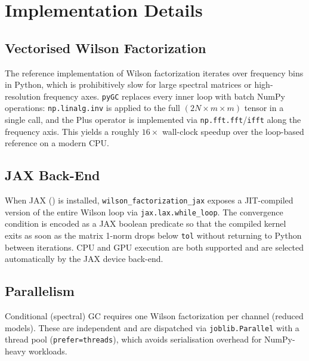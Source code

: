 \documentclass[10pt,a4paper,onecolumn]{article}
\begin{document}
\section{Implementation Details}\label{implementation}

\subsection{Vectorised Wilson Factorization}\label{vectorised-wilson}

The reference implementation of Wilson factorization iterates over
frequency bins in Python, which is prohibitively slow for large spectral
matrices or high-resolution frequency axes. \texttt{pyGC} replaces every
inner loop with batch NumPy operations: \texttt{np.linalg.inv} is
applied to the full \((2N \times m \times m)\) tensor in a single call,
and the Plus operator is implemented via \texttt{np.fft.fft}/\texttt{ifft}
along the frequency axis. This yields a roughly \(16\times\) wall-clock
speedup over the loop-based reference on a modern CPU.

\subsection{JAX Back-End}\label{jax-backend}

When JAX () is installed,
\texttt{wilson\_factorization\_jax} exposes a JIT-compiled version of
the entire Wilson loop via \texttt{jax.lax.while\_loop}. The convergence
condition is encoded as a JAX boolean predicate so that the compiled
kernel exits as soon as the matrix 1-norm drops below \texttt{tol}
without returning to Python between iterations. CPU and GPU execution
are both supported and are selected automatically by the JAX device
back-end.

\subsection{Parallelism}\label{parallelism}

Conditional (spectral) GC requires one Wilson factorization per channel
(reduced models). These are independent and are dispatched via
\texttt{joblib.Parallel} with a thread pool
(\texttt{prefer=\textquotesingle{}threads\textquotesingle{}}), which
avoids serialisation overhead for NumPy-heavy workloads.

\end{document}

